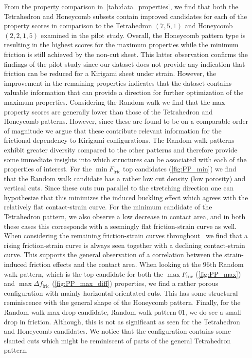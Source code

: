 From the property comparison in~\cref{tab:data_properties}, we find that both the
Tetrahedron and Honeycomb subsets contain improved candidates for each of the
property scores in comparison to the Tetrahedron $(7,5,1)$ and Honeycomb
$(2,2,1,5)$ examined in the pilot study. Overall, the Honeycomb pattern type is
resulting in the highest scores for the maximum properties while the minimum
friction is still achieved by the non-cut sheet. This latter observation
confirms the findings of the pilot study since our dataset does not provide any
indication that friction can be reduced for a Kirigami sheet under strain.
However, the improvement in the remaining properties indicates that the dataset
contains valuable information that can provide a direction for further optimization of
the maximum properties. Considering the Random walk we find that the max
property scores are generally lower than those of the Tetrahedron and Honeycomb
patterns. However, since these are found to be on a comparable order of
magnitude we argue that these contribute relevant information for the
frictional dependency to Kirigami configurations. The Random walk patterns
exhibit greater diversity compared to the other patterns and therefore provide
some immediate insights into which structures can be associated with each of the
properties of interest. For the $\min F_{\text{fric}}$ top candidates
(\cref{fig:PP_min}) we find that the Random walk candidate has a rather low cut
density (low porosity) and vertical cuts. Since these cuts run parallel to
the stretching direction one can hypothesize that this minimizes the induced
buckling effect which agrees with the relatively flat contact-strain curve. For the minimum candidate of the Tetrahedron pattern, we also observe
a low decrease in contact area, and in both these cases this corresponds with a
seemingly flat friction-strain curve as well. When considering the remaining
friction-strain curves throughout~ we
find that a rising friction-strain curve is always seen together with a
declining contact-strain curve. This supports the general observation of a
correlation between the strain-induced friction effects and the contact area.
When looking at the $96\text{th}$ Random walk pattern, which is the top
candidate for both the $\max F_{\text{fric}}$ (\cref{fig:PP_max}) and $\max
\Delta f_{\text{fric}}$ (\cref{fig:PP_max_diff}) properties, we find a rather
porous configuration with mainly horizontal-orientated cuts. This has some
structural reminiscence with the general shape of the Honeycomb pattern.
Finally, for the Random walk max drop candidate, Random walk pattern 01, we do see a
small drop in friction. Although, this is not as significant as seen for the
Tetrahedron and Honeycomb candidates. We notice that the configuration contains
some slanted cuts which might be reminiscent of parts of the general Tetrahedron
pattern. 




